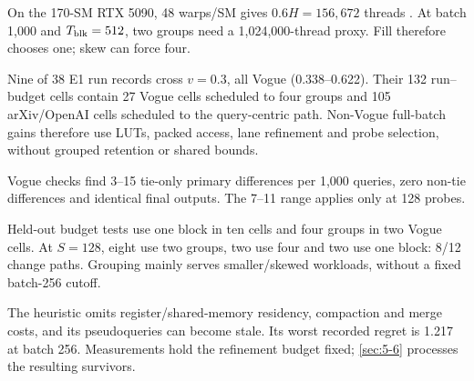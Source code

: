 On the 170-SM RTX 5090, 48 warps/SM gives $0.6H=156{,}672$ threads \cite{blackwell_tuning}. At batch 1,000 and $T_{\rm blk}=512$, two groups need a 1,024,000-thread proxy. Fill therefore chooses one; skew can force four.

Nine of 38 E1 run records cross $v=0.3$, all Vogue (0.338--0.622).
Their 132
run--budget cells contain 27 Vogue cells scheduled to four groups and
105 arXiv/OpenAI cells scheduled to the query-centric path.
Non-Vogue full-batch gains therefore use LUTs, packed access, lane refinement and probe selection, without grouped retention or shared bounds.

Vogue checks find 3--15 tie-only primary differences per 1,000 queries, zero non-tie differences and identical final outputs. The 7--11 range applies only at 128 probes.

Held-out budget tests use one block in ten cells and four groups in two Vogue cells. At $S=128$, eight use two groups, two use four and two use one block: 8/12 change paths. Grouping mainly serves smaller/skewed workloads, without a fixed batch-256 cutoff.

The heuristic omits register/shared-memory residency, compaction and merge costs, and its pseudoqueries can become stale. Its worst recorded regret is 1.217 at batch 256. Measurements hold the refinement budget fixed; \cref{sec:5-6} processes the resulting survivors.